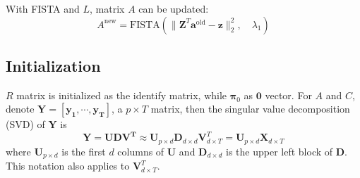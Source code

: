 \documentclass[fleqn]{article}
\newcommand{\T}{T}
\begin{document}
%
%



With FISTA and $L$, matrix $A$ can be updated:
\begin{equation}\label{eq:updatea}
A^{\text{new}} = \text{FISTA}(\|\mathbf{Z}^{\T}\mathbf{a}^{\text{old}} -\mathbf{z}\|_2^2,\quad \lambda_1)
\end{equation}

\subsection{Initialization}\label{sec:initial}
$R$ matrix is initialized as the identify matrix, while $\mathbf{\pi}_0$ as $\mathbf{0}$ vector. For $A$ and $C$, denote $\mathbf{Y} = \left[\mathbf{y_1},\cdots,\mathbf{y_T}\right]$, a $p\times T$ matrix, then the singular value decomposition (SVD) of $\mathbf{Y}$ is
\begin{equation}\label{eq:initial}
    \mathbf{Y} = \mathbf{UDV^{\T}} \approx \mathbf{U}_{p \times d} \mathbf{D}_{d \times d} \mathbf{V}_{d \times T}^{\T} =\mathbf{U}_{p\times d}\mathbf{X}_{d \times T}
\end{equation}
where $\mathbf{U}_{p \times d}$ is the first $d$ columns of $\mathbf{U}$ and $\mathbf{D}_{d\times d}$ is the upper left block of $\mathbf{D}$. This notation also applies to $\mathbf{V}^{\T}_{d \times T}$.
\end{document}
